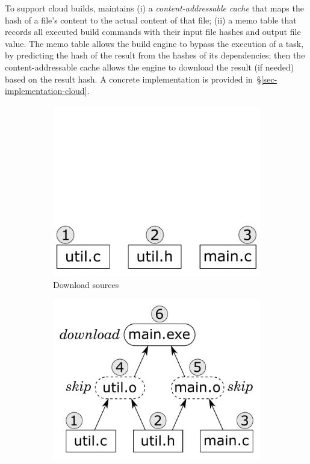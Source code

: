 To support cloud builds, \Bazel maintains (i) a \emph{content-addressable cache}
that maps the hash of a file's content to the actual content of that file;
(ii) a memo table that records all executed build commands
with their input file hashes and output file value.
The memo table allows the build engine to bypass the execution
of a task, by predicting the hash of the result from the hashes of its
dependencies; then the content-addressable cache allows the engine
to download the result (if needed) based on the result hash. A concrete
implementation is provided in~\S\ref{sec-implementation-cloud}.

\begin{figure}
\begin{subfigure}[b]{0.25\linewidth}
\centerline{\includegraphics[scale=0.28]{fig/bazel-example-checkout.pdf}}
\vspace{-0.5mm}
\caption{Download sources}
\end{subfigure}
\begin{subfigure}[b]{0.40\linewidth}
\centerline{\includegraphics[scale=0.28]{fig/bazel-example-build.pdf}}

\end{subfigure}
\end{figure}
